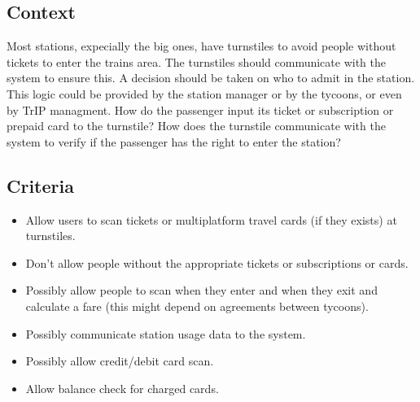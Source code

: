 \subsection*{Context}

Most stations, expecially the big ones, have turnstiles to avoid people without tickets to enter the trains area.
The turnstiles should communicate with the system to ensure this. A decision should be taken on who to admit in the station.
This logic could be provided by the station manager or by the tycoons, or even by TrIP managment.
How do the passenger input its ticket or subscription or prepaid card to the turnstile?
How does the turnstile communicate with the system to verify if the passenger has the right to enter the station?

\subsection*{Criteria}
\begin{itemize}
    \item Allow users to scan tickets or multiplatform travel cards (if they exists) at turnstiles.
    \item Don't allow people without the appropriate tickets or subscriptions or cards.
    \item Possibly allow people to scan when they enter and when they exit and calculate a fare (this might depend on agreements between tycoons). 
    \item Possibly communicate station usage data to the system.
    \item Possibly allow credit/debit card scan.
    \item Allow balance check for charged cards.
\end{itemize}

